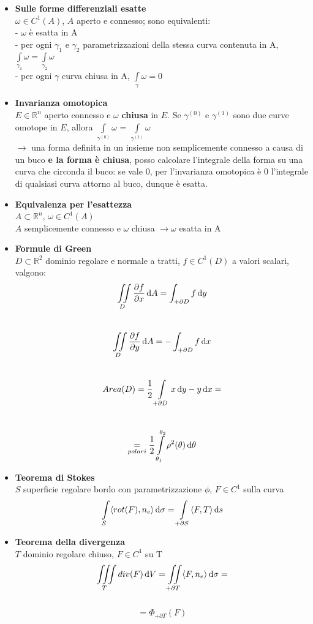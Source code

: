 \documentclass[a4paper,portrait,columns=3,5pt]{cheatsheet}
\begin{document}
\begin{itemize}
	\item \textbf{Sulle forme differenziali esatte}\\
			$\omega \in C^1(A)$, $A$ aperto e connesso; sono equivalenti:\\
				- $\omega$ è esatta in A\\
				- per ogni $\gamma_1$ e $\gamma_2$ parametrizzazioni della stessa curva contenuta in A, 
					$\int\limits_{\gamma_1} \omega = \int\limits_{\gamma_2}\omega$\\
				- per ogni $\gamma$ curva chiusa in A, $\int\limits_\gamma \omega = 0$
	\item \textbf{Invarianza omotopica}\\
		$E \in \mathbb{R}^n$ aperto connesso e $\omega$ \textbf{chiusa} in $E$. Se $\gamma^{(0)}$ e $\gamma^{(1)}$ sono due curve omotope in $E$, allora $\int\limits_{\gamma^{(0)}} \omega$ = $\int\limits_{\gamma^{(1)}} \omega$ \\
		$\to$ una forma definita in un insieme non semplicemente connesso a causa di un buco \textbf{e la forma è chiusa}, posso calcolare l'integrale della forma su una curva che circonda il buco: se vale 0, per l'invarianza omotopica è 0 l'integrale di qualsiasi curva attorno al buco, dunque è esatta.
	
	\item \textbf{Equivalenza per l'esattezza}\\
			$A\subset \mathbb{R}^n$, $\omega \in C^1(A)$\\ $A$ semplicemente connesso e $\omega$ chiusa $\to \omega$ esatta in A
	\item \textbf{Formule di Green}\\
			$D \subset \mathbb{R}^2$ dominio regolare e normale a tratti, $f \in C^1(D)$ a valori scalari, valgono:\\
			 $$\iint\limits_D\dfrac{\partial f}{\partial x} \dif A = \int_{+\partial D} f \dif y$$\\
			$$\iint\limits_D \dfrac{\partial f}{\partial y} \dif A = -\int_{+\partial D} f \dif x$$\\
			$$ Area(D) = \frac{1}{2} \int\limits_{+\partial D} x\dif y - y\dif x = $$ \\
			 $$ \underset{polari}{=} \frac{1}{2}\int\limits_{\theta_1}^{\theta_2} \rho^2(\theta) \dif \theta$$
	\item \textbf{Teorema di Stokes}\\ 
			$S$ superficie regolare bordo con parametrizzazione $\phi$, $F \in C^1$ sulla curva 
			$$ \int\limits_S \langle rot(F), n_e \rangle \dif \sigma = \int\limits_{+\partial S}\langle F, T \rangle \dif s$$ 
	\item \textbf{Teorema della divergenza}\\
			$T$ dominio regolare chiuso, $F \in C^1$ su T
			$$ \iiint\limits_T div(F) \dif V = \iint\limits_{+\partial T} \langle F, n_e \rangle \dif \sigma =$$ \\
			$$ = \Phi_{+\partial T}(F)$$
\end{itemize}
\end{document}
